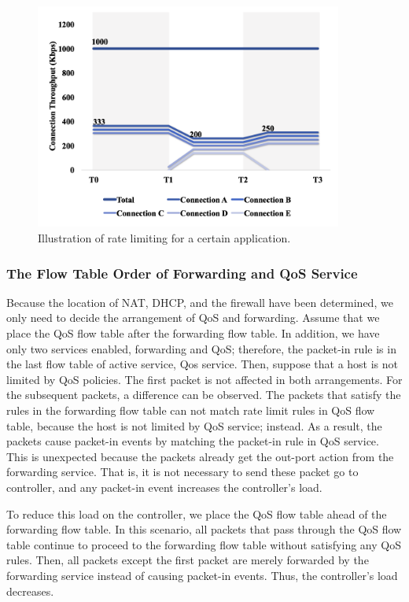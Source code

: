 \begin{figure}[!t]
\centering
\includegraphics[width=0.9\textwidth]{./fig/mft_qos_rate_app}
\caption{Illustration of rate limiting for a certain application.}
\label{fig:mft_qos_rate_app}
\end{figure}

\subsubsection{The Flow Table Order of Forwarding and QoS Service}
Because the location of NAT, DHCP, and the firewall have been determined, we only need to decide the arrangement of QoS and forwarding. Assume that we place the QoS flow table after the forwarding flow table. In addition, we have only two services enabled, forwarding and QoS; therefore, the packet-in rule is in the last flow table of active service, Qos service. Then, suppose that a host is not limited by QoS policies. The first packet is not affected in both arrangements. For the subsequent packets, a difference can be observed. The packets that satisfy the rules in the forwarding flow table can not match rate limit rules in QoS flow table, because the host is not limited by QoS service; instead. As a result, the packets cause packet-in events by matching the packet-in rule in QoS service. This is unexpected because the packets already get the out-port action from the forwarding service. That is, it is not necessary to send these packet go to controller, and any packet-in event increases the controller’s load.

To reduce this load on the controller, we place the QoS flow table ahead of the forwarding flow table. In this scenario, all packets that pass through the QoS flow table continue to proceed to the forwarding flow table without satisfying any QoS rules. Then, all packets except the first packet are merely forwarded by the forwarding service instead of causing packet-in events. Thus, the controller’s load decreases.
